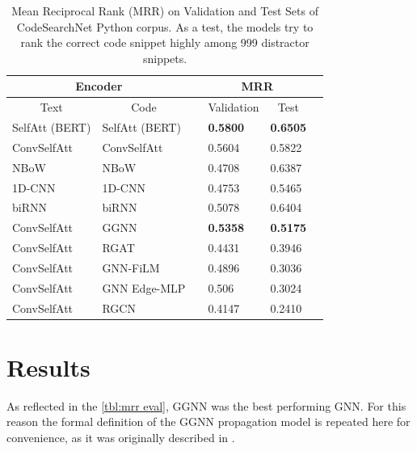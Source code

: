 \documentclass{article}
\begin{document}
\begin{table}[t]
  \begin{tabular}{@{}llllll@{}} \toprule
  \multicolumn{2}{c}{Encoder}&&\multicolumn{2}{c}{MRR}&\\\midrule
  
  \multicolumn{1}{c}{Text} & \multicolumn{1}{c}{Code} && \multicolumn{1}{c}{Validation} & \multicolumn{1}{c}{Test} &  \\ \midrule
  
  SelfAtt (BERT) & SelfAtt (BERT) && \textbf{0.5800} & \textbf{0.6505} \\
  ConvSelfAtt & ConvSelfAtt && 0.5604 & 0.5822 \\ 
  NBoW & NBoW && 0.4708 & 0.6387 \\
  1D-CNN & 1D-CNN && 0.4753 & 0.5465 \\
  biRNN & biRNN && 0.5078 & 0.6404\\\midrule
  ConvSelfAtt & GGNN && \textbf{0.5358} & \textbf{0.5175} \\
  ConvSelfAtt & RGAT && 0.4431 & 0.3946 \\
  ConvSelfAtt & GNN-FiLM && 0.4896 & 0.3036 \\
  ConvSelfAtt & GNN Edge-MLP && 0.506 & 0.3024 \\
  ConvSelfAtt & RGCN && 0.4147 & 0.2410 \\

  \bottomrule
  \end{tabular}
  \caption{Mean Reciprocal Rank (MRR) on Validation and Test Sets of CodeSearchNet Python corpus. As a test, the models try to rank the correct code snippet highly among 999 distractor snippets.} \label{tbl:mrr eval}
\end{table}

\section{Results}

As reflected in the \autoref{tbl:mrr eval}, GGNN was the best performing GNN. For this reason the formal definition of the GGNN propagation model is repeated here for convenience, as it was originally described in \cite{1511.05493}. 
\end{document}
